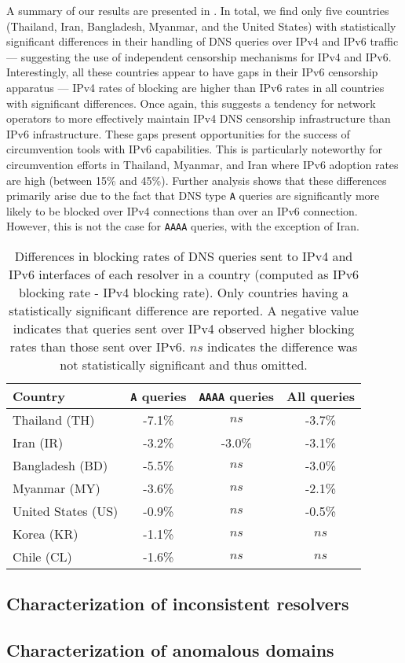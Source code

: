 A summary of our results are presented in .
In total, we find only five countries (Thailand, Iran, Bangladesh, Myanmar, and
the United States) with statistically significant differences in their handling
of DNS queries over IPv4 and IPv6 traffic --- suggesting the use of independent
censorship mechanisms for IPv4 and IPv6. 
%
Interestingly, all these countries appear to have gaps in their IPv6 censorship
apparatus --- \ie IPv4 rates of blocking are higher than IPv6 rates in all
countries with significant differences. Once again, this suggests a tendency
for network operators to more effectively maintain IPv4 DNS censorship
infrastructure than IPv6 infrastructure. These gaps present opportunities for
the success of circumvention tools with IPv6 capabilities. 
%
This is particularly noteworthy for circumvention efforts in Thailand, Myanmar,
and Iran where IPv6 adoption rates are high (between 15\% and 45\%).
%
Further analysis shows that these differences primarily arise due to the fact
that DNS type {\tt A} queries are significantly more likely to be blocked over
IPv4 connections than over an IPv6 connection. However, this is not the case
for {\tt AAAA} queries, with the exception of Iran.

\begin{table}[t]
  \centering
  \small
  \scalebox{\tabularscale} {
  \begin{tabular}{lccc}%
    \toprule
    {\bf Country}&{\bf {\tt A} queries }&{\bf {\tt AAAA} queries} & {\bf All queries}
    \\ \midrule
    Thailand (TH)      & -7.1\% & $ns$    & -3.7\%  \\
    Iran (IR)          & -3.2\% & -3.0\%  & -3.1\%  \\ 
    Bangladesh (BD)    & -5.5\% & $ns$    & -3.0\%  \\
    Myanmar (MY)       & -3.6\% & $ns$    & -2.1\%  \\
    United States (US) & -0.9\% & $ns$    & -0.5\%  \\
    \midrule
    Korea (KR)         & -1.1\% & $ns$    & $ns$ \\
    Chile (CL)         & -1.6\% & $ns$    & $ns$ \\
    \bottomrule
  \end{tabular}
  }
  \caption{Differences in blocking rates of DNS queries sent to IPv4 and IPv6
  interfaces of each resolver in a country (computed as IPv6 blocking rate
  - IPv4 blocking rate). Only countries having a statistically significant
  difference are reported. A negative value indicates that queries sent over
  IPv4 observed higher blocking rates than those sent over IPv6. $ns$ indicates
  the difference was not statistically significant and thus omitted.}
  \label{tab:infrastructure:countries}
\end{table}

\subsection{Characterization of inconsistent resolvers}
\label{sec:infrastructure:resolvers}


\subsection{Characterization of anomalous domains}
\label{sec:infrastructure:domains}

